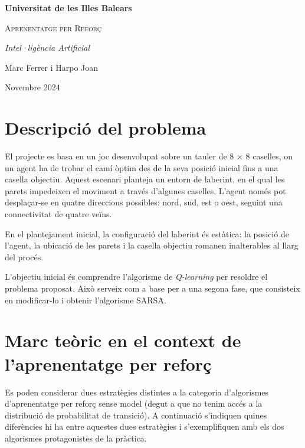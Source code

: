 \documentclass{article}
\begin{document}
\begin{titlepage}
    \centering
    {\bfseries\large Universitat de les Illes Balears \par 
    \vspace{1cm}}
    {\scshape\Huge Aprenentatge per Reforç \par}
    \vspace{1cm}
    {\itshape\Large Intel·ligència Artificial \par}
    \vfill
    {\Large Marc Ferrer i Harpo Joan\par}
\vfill
{\Large Novembre 2024 \par}
\vfill
\end{titlepage}

\newpage

\tableofcontents

\newpage

\section{Descripció del problema}
El projecte es basa en un joc desenvolupat sobre un tauler de 8 × 8 caselles, on un agent ha de trobar el camí òptim des de la seva posició inicial fins a una casella objectiu. Aquest escenari planteja un entorn de laberint, en el qual les parets impedeixen el moviment a través d'algunes caselles. L'agent només pot desplaçar-se en quatre direccions possibles: nord, sud, est o oest, seguint una connectivitat de quatre veïns.

En el plantejament inicial, la configuració del laberint és estàtica: la posició de l'agent, la ubicació de les parets i la casella objectiu romanen inalterables al llarg del procés.

L'objectiu inicial és comprendre l'algorisme de \textit{Q-learning} per resoldre el problema proposat. Això serveix com a base per a una segona fase, que consisteix en modificar-lo i obtenir l'algorisme SARSA.

\section{Marc teòric en el context de l'aprenentatge per reforç}
Es poden considerar dues estratègies distintes a la categoria d'algorismes d'aprenentatge per reforç sense model (degut a que no tenim accés a la distribució de probabilitat de transició). A continuació s'indiquen quines diferències hi ha entre aquestes dues estratègies i s'exemplifiquen amb els dos algorismes protagonistes de la pràctica.
\end{document}
